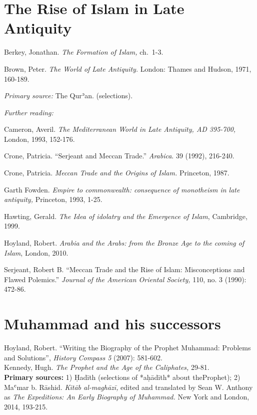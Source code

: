 \documentclass[
]{book}
\begin{document}
\hypertarget{the-rise-of-islam-in-late-antiquity}{%
\chapter{The Rise of Islam in Late Antiquity}\label{the-rise-of-islam-in-late-antiquity}}

Berkey, Jonathan. \emph{The Formation of Islam,} ch.~1-3.

Brown, Peter. \emph{The World of Late Antiquity.} London: Thames and Hudson, 1971, 160-189.

\emph{Primary source:} The Qurʾan. (selections).

\emph{Further reading:}

Cameron, Averil. \emph{The Mediterranean World in Late Antiquity, AD 395-700,} London, 1993, 152-176.

Crone, Patricia. ``Serjeant and Meccan Trade.'' \emph{Arabica}. 39 (1992), 216-240.

Crone, Patricia. \emph{Meccan Trade and the Origins of Islam.} Princeton, 1987.

Garth Fowden. \emph{Empire to commonwealth: consequence of monotheism in late antiquity,} Princeton, 1993, 1-25.

Hawting, Gerald. \emph{The Idea of idolatry and the Emergence of Islam}, Cambridge, 1999.

Hoyland, Robert. \emph{Arabia and the Arabs: from the Bronze Age to the coming of Islam}, London, 2010.

Serjeant, Robert B. ``Meccan Trade and the Rise of Islam: Misconceptions and Flawed Polemics.'' \emph{Journal of the American Oriental Society,} 110, no. 3 (1990): 472-86.

\hypertarget{muhammad-and-his-successors}{%
\chapter{Muhammad and his successors}\label{muhammad-and-his-successors}}

Hoyland, Robert. ``Writing the Biography of the Prophet Muhammad: Problems and Solutions'', \emph{History Compass 5} (2007): 581-602.\\
Kennedy, Hugh. \emph{The Prophet and the Age of the Caliphates,} 29-81.\\

\textbf{Primary sources:} 1) Ḥadīth (selections of *aḥādīth* about theProphet); 2) Maʿmar b. Rāshid. \emph{Kitāb al-maghāzī,} edited and translated by Sean W. Anthony as \emph{The Expeditions: An Early Biography of Muhammad.} New York and London, 2014, 193-215.
\end{document}
